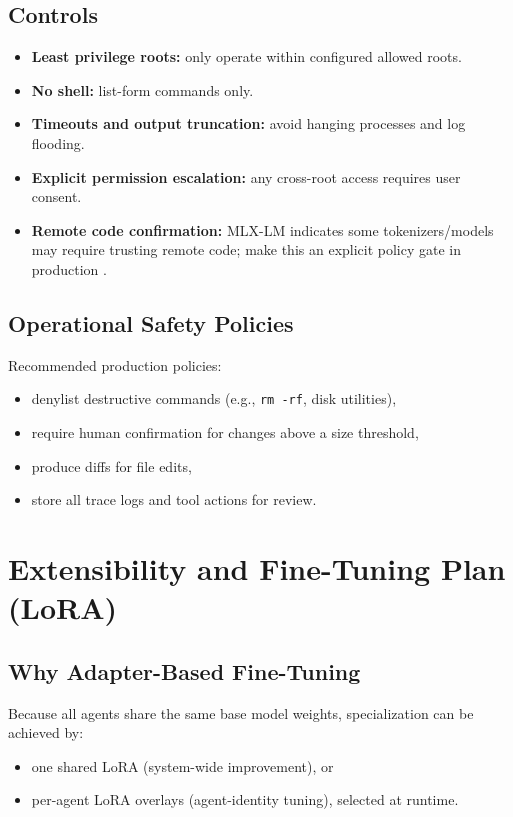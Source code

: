 \documentclass[11pt]{article}
\begin{document}
\subsection{Controls}

\begin{itemize}
  \item \textbf{Least privilege roots:} only operate within configured allowed roots.
  \item \textbf{No shell:} list-form commands only.
  \item \textbf{Timeouts and output truncation:} avoid hanging processes and log flooding.
  \item \textbf{Explicit permission escalation:} any cross-root access requires user consent.
  \item \textbf{Remote code confirmation:} MLX-LM indicates some tokenizers/models may require trusting remote code; make this an explicit policy gate in production \cite{MLXLM_Readme}.
\end{itemize}

\subsection{Operational Safety Policies}

Recommended production policies:
\begin{itemize}
  \item denylist destructive commands (e.g., \texttt{rm -rf}, disk utilities),
  \item require human confirmation for changes above a size threshold,
  \item produce diffs for file edits,
  \item store all trace logs and tool actions for review.
\end{itemize}

\section{Extensibility and Fine-Tuning Plan (LoRA)}

\subsection{Why Adapter-Based Fine-Tuning}

Because all agents share the same base model weights, specialization can be achieved by:
\begin{itemize}
  \item one shared LoRA (system-wide improvement), or
  \item per-agent LoRA overlays (agent-identity tuning), selected at runtime.
\end{itemize}
\end{document}
